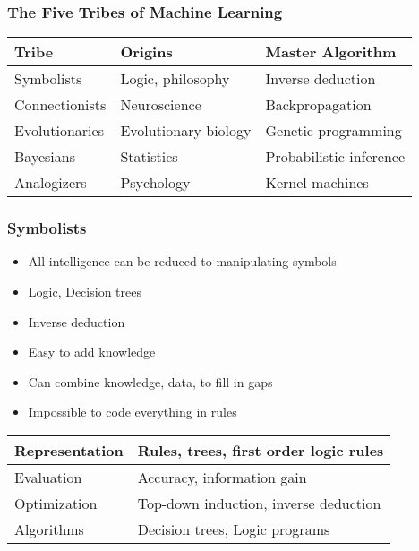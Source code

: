 \documentclass[UTF8,11pt,colorlinks,compress,openany]{beamer}%
\begin{document}
\begin{frame}\frametitle{The Five Tribes of Machine Learning}
\begin{table}
\begin{tabu}{l|l|l}
\hline
\textbf{Tribe} &\textbf{Origins} &\textbf{Master Algorithm}\\
\hline
Symbolists &Logic, philosophy &Inverse deduction\\
\hline
Connectionists &Neuroscience &Backpropagation\\
\hline
Evolutionaries &Evolutionary biology &Genetic programming\\
\hline
Bayesians &Statistics &Probabilistic inference\\
\hline
Analogizers &Psychology &Kernel machines\\
\hline
\end{tabu}
\end{table}
\end{frame}

\begin{frame}\frametitle{Symbolists}
\begin{itemize}
	\item All intelligence can be reduced to manipulating symbols
	\item Logic, Decision trees
	\item Inverse deduction
	\item Easy to add knowledge
	\item Can combine knowledge, data, to fill in gaps
	\item Impossible to code everything in rules
\end{itemize}
\begin{table}
\begin{tabu}{l|l}
\hline
Representation &Rules, trees, first order logic rules\\
\hline
Evaluation &Accuracy, information gain\\
\hline
Optimization &Top-down induction, inverse deduction\\
\hline
Algorithms &Decision trees, Logic programs\\
\hline
\end{tabu}
\end{table}
\end{frame}
\end{document}
